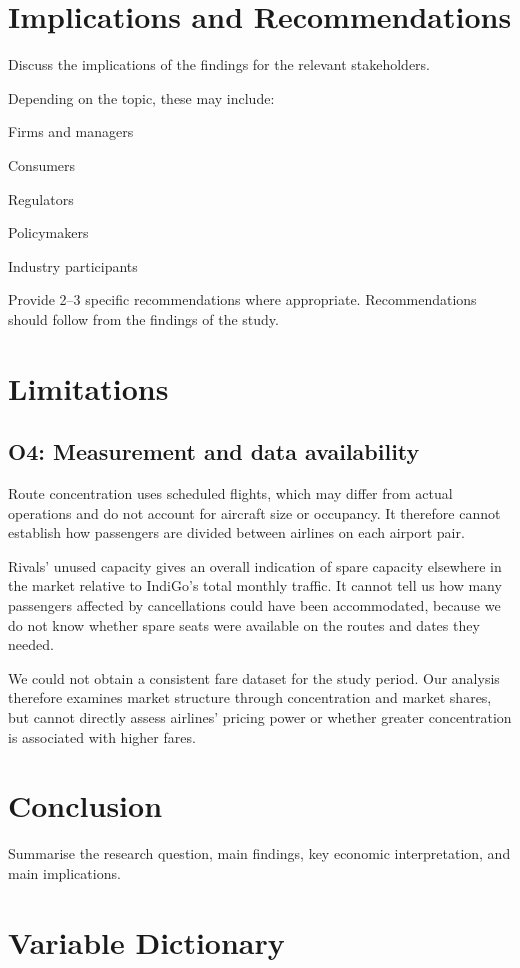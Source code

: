 \documentclass[12pt,a4paper]{article}
\newcommand{\templatebullet}[1]{\par\noindent\textbullet\hspace{5.88pt}#1\par}
\begin{document}
\section{Implications and Recommendations}
Discuss the implications of the findings for the relevant stakeholders.

Depending on the topic, these may include:
\templatebullet{Firms and managers}
\templatebullet{Consumers}
\templatebullet{Regulators}
\templatebullet{Policymakers}
\templatebullet{Industry participants}
Provide 2--3 specific recommendations where appropriate. Recommendations should follow from the findings of the study.

\clearpage
\section{Limitations}
\subsection{O4: Measurement and data availability}
Route concentration uses scheduled flights, which may differ from actual operations and do not account for aircraft size or occupancy. It therefore cannot establish how passengers are divided between airlines on each airport pair.

Rivals' unused capacity gives an overall indication of spare capacity elsewhere in the market relative to IndiGo's total monthly traffic. It cannot tell us how many passengers affected by cancellations could have been accommodated, because we do not know whether spare seats were available on the routes and dates they needed.

We could not obtain a consistent fare dataset for the study period. Our analysis therefore examines market structure through concentration and market shares, but cannot directly assess airlines' pricing power or whether greater concentration is associated with higher fares.

\section{Conclusion}
Summarise the research question, main findings, key economic interpretation, and main implications.

\newpage
\nocite{kubicek2026aviationstats,dgcaDomesticSchedules}
\printbibliography[title={References}]

\newpage
\appendix
\section{Variable Dictionary}
\label{app:o4-dictionary}
\end{document}

